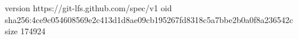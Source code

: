 version https://git-lfs.github.com/spec/v1
oid sha256:4ce9c054608569e2c413d1d8ae09cb195267fd8318c5a7bbe2b0a0f8a236542c
size 174924
